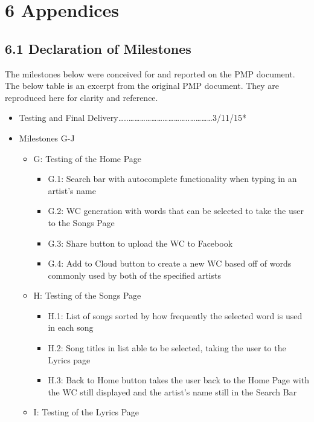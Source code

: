 \documentclass[]{article}
\begin{document}
\section{\textbf{6 Appendices }}\label{appendices}

\subsection{\textbf{6.1 Declaration of
Milestones}}\label{declaration-of-milestones}

The milestones below were conceived for and reported on the PMP
document. The below table is an excerpt from the original PMP document.
They are reproduced here for clarity and reference.

\begin{itemize}
\itemsep1pt\parskip0pt
\item
  Testing and Final
  Delivery\ldots{}..\ldots{}\ldots{}\ldots{}\ldots{}\ldots{}\ldots{}\ldots{}\ldots{}\ldots{}\ldots{}..\ldots{}\ldots{}\ldots{}\ldots{}3/11/15*
\item
  Milestones G-J

  \begin{itemize}
  \itemsep1pt\parskip0pt
  \item
    G: Testing of the Home Page

    \begin{itemize}
    \itemsep1pt\parskip0pt
    \item
      G.1: Search bar with autocomplete functionality when typing in an
      artist's name
    \item
      G.2: WC generation with words that can be selected to take the
      user to the Songs Page
    \item
      G.3: Share button to upload the WC to Facebook
    \item
      G.4: Add to Cloud button to create a new WC based off of words
      commonly used by both of the specified artists
    \end{itemize}
  \item
    H: Testing of the Songs Page

    \begin{itemize}
    \itemsep1pt\parskip0pt
    \item
      H.1: List of songs sorted by how frequently the selected word is
      used in each song
    \item
      H.2: Song titles in list able to be selected, taking the user to
      the Lyrics page
    \item
      H.3: Back to Home button takes the user back to the Home Page with
      the WC still displayed and the artist's name still in the Search
      Bar
    \end{itemize}
  \item
    I: Testing of the Lyrics Page


\end{itemize}
\end{itemize}
\end{document}
